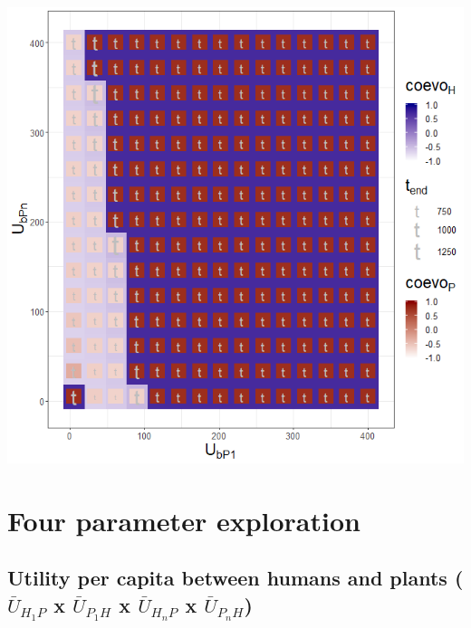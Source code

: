 \documentclass[]{book}
\begin{document}
\includegraphics[width=1\linewidth]{plots/3_twoPar-U.bP1-U.bPn_plot}

\hypertarget{four-parameter-exploration}{%
\chapter{Four parameter exploration}\label{four-parameter-exploration}}

\newpage

\hypertarget{utility-per-capita-between-humans-and-plants-baru_h_1p-x-baru_p_1h-x-baru_h_np-x-baru_p_nh}{%
\section{\texorpdfstring{Utility per capita between humans and plants (\(\bar{U}_{H_{1}P}\) x \(\bar{U}_{P_{1}H}\) x \(\bar{U}_{H_{n}P}\) x \(\bar{U}_{P_{n}H}\))}{Utility per capita between humans and plants (\textbackslash{}bar\{U\}\_\{H\_\{1\}P\} x \textbackslash{}bar\{U\}\_\{P\_\{1\}H\} x \textbackslash{}bar\{U\}\_\{H\_\{n\}P\} x \textbackslash{}bar\{U\}\_\{P\_\{n\}H\})}}\label{utility-per-capita-between-humans-and-plants-baru_h_1p-x-baru_p_1h-x-baru_h_np-x-baru_p_nh}}
\end{document}
